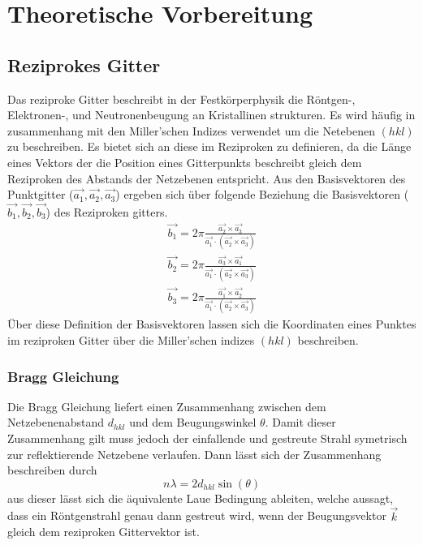 \section{Theoretische Vorbereitung}
    \subsection{Reziprokes Gitter}
        Das reziproke Gitter beschreibt in der Festkörperphysik die Röntgen-, Elektronen-, und Neutronenbeugung
        an Kristallinen strukturen. Es wird häufig in zusammenhang mit den Miller'schen Indizes verwendet
        um die Netebenen $(hkl)$ zu beschreiben. Es bietet sich an diese im Reziproken zu definieren, da die Länge
        eines Vektors der die Position eines Gitterpunkts beschreibt gleich dem Reziproken des Abstands der
        Netzebenen entspricht.
        Aus den Basisvektoren des Punktgitter ($\vec{a_1},\vec{a_2},\vec{a_3}$) ergeben sich über folgende Beziehung
        die Basisvektoren ($\vec{b_1},\vec{b_2},\vec{b_3}$) des Reziproken gitters.
        \begin{align*}
            \vec{b_1} = 2\pi \frac{\vec{a_2}\times \vec{a_3}}{\vec{a_1}\cdot (\vec{a_2}\times \vec{a_3})}
            \\\vec{b_2} = 2\pi \frac{\vec{a_3}\times \vec{a_1}}{\vec{a_1}\cdot (\vec{a_2}\times \vec{a_3})}
            \\\vec{b_3} = 2\pi \frac{\vec{a_1}\times \vec{a_2}}{\vec{a_1}\cdot (\vec{a_2}\times \vec{a_3})}
        \end{align*}
        Über diese Definition der Basisvektoren lassen sich die Koordinaten eines Punktes im reziproken Gitter
        über die Miller'schen indizes $(hkl)$ beschreiben.
        
        \subsubsection*{Bragg Gleichung}
            Die Bragg Gleichung liefert einen Zusammenhang zwischen dem Netzebenenabstand $d_{hkl}$ und dem
            Beugungswinkel $\theta$. Damit dieser Zusammenhang gilt muss jedoch der einfallende und gestreute
            Strahl symetrisch zur reflektierende Netzebene verlaufen. Dann lässt sich der Zusammenhang beschreiben durch
            \begin{equation}
                n\lambda = 2d_{hkl} \sin(\theta)
            \end{equation}
            aus dieser lässt sich die äquivalente Laue Bedingung ableiten, welche aussagt,
            dass ein Röntgenstrahl genau dann gestreut wird, wenn der Beugungsvektor $\vec{k}$ gleich dem
            reziproken Gittervektor ist. 
    
